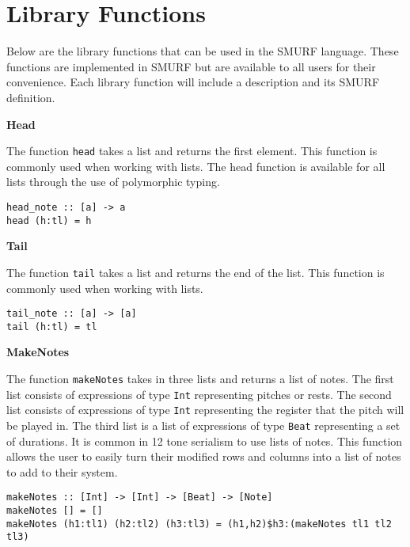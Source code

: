 \section{Library Functions}

Below are the library functions that can be used in the SMURF language. 
These functions are implemented in SMURF but are available to all users 
for their convenience. Each library function will include a description 
and its SMURF definition. \newline

\noindent\textbf{Head}

The function \texttt{head} takes a list and returns the first element. 
This function is commonly used when working with lists. The head function
is available for all lists through the use of polymorphic typing. 

\begin{verbatim}
head_note :: [a] -> a
head (h:tl) = h
\end{verbatim} 


\noindent\textbf{Tail}

The function \texttt{tail} takes a list and returns the end of the list.
This function is commonly used when working with lists. 

\begin{verbatim}
tail_note :: [a] -> [a]
tail (h:tl) = tl
\end{verbatim} 


\noindent\textbf{MakeNotes}

The function \texttt{makeNotes} takes in three lists and returns a list 
of notes. The first list consists of expressions of type \texttt{Int} representing 
pitches or rests. The second list consists of expressions of type \texttt{Int}
representing the register that the pitch will be played in. The third list is a list 
of expressions of type \texttt{Beat} representing a set of durations. It is common in 
12 tone serialism to use lists of notes. This function allows the user 
to easily turn their modified rows and columns into a list of notes to add 
to their system. 

\begin{verbatim}
makeNotes :: [Int] -> [Int] -> [Beat] -> [Note]
makeNotes [] = []
makeNotes (h1:tl1) (h2:tl2) (h3:tl3) = (h1,h2)$h3:(makeNotes tl1 tl2 tl3)
\end{verbatim}
